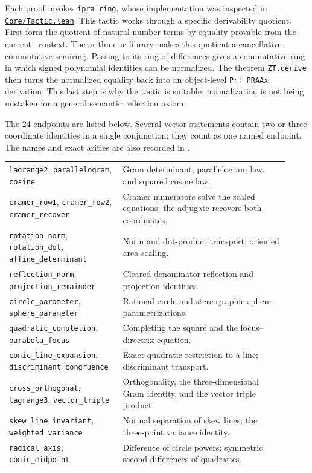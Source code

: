 Each proof invokes \texttt{ipra\_ring}, whose implementation was inspected in
\href{https://github.com/VladimirReshetnikov/ProveIt/blob/bbb85238dac533fc4b7b84a750cca864fe35fed5/Logic/PrimitiveRecursiveArithmetic/Derivations/Lean/IPRADerivations/Core/Tactic.lean}{\texttt{Core/Tactic.lean}}.
This tactic works through a specific derivability quotient.  First form the
quotient of natural-number terms by equality provable from the current
\ipra\ context.  The arithmetic library makes this quotient a cancellative
commutative semiring.  Passing to its ring of differences gives a commutative
ring in which signed polynomial identities can be normalized.  The theorem
\texttt{ZT.derive} then turns the normalized equality back into an object-level
\texttt{Prf PRAAx} derivation.  This last step is why the tactic is suitable:
normalization is not being mistaken for a general semantic reflection axiom.

The 24 endpoints are listed below.  Several vector statements contain two or
three coordinate identities in a single conjunction; they count as one named
endpoint.  The names and exact arities are also recorded in
.

\begin{center}
\begin{tabular}{p{0.36\linewidth}p{0.56\linewidth}}
\texttt{lagrange2}, \texttt{parallelogram}, \texttt{cosine}
 & Gram determinant, parallelogram law, and squared cosine law.\\[4pt]
\texttt{cramer\_row1}, \texttt{cramer\_row2}, \texttt{cramer\_recover}
 & Cramer numerators solve the scaled equations; the adjugate recovers both
 coordinates.\\[4pt]
\texttt{rotation\_norm}, \texttt{rotation\_dot}, \texttt{affine\_determinant}
 & Norm and dot-product transport; oriented area scaling.\\[4pt]
\texttt{reflection\_norm}, \texttt{projection\_remainder}
 & Cleared-denominator reflection and projection identities.\\[4pt]
\texttt{circle\_parameter}, \texttt{sphere\_parameter}
 & Rational circle and stereographic sphere parametrizations.\\[4pt]
\texttt{quadratic\_completion}, \texttt{parabola\_focus}
 & Completing the square and the focus--directrix equation.\\[4pt]
\texttt{conic\_line\_expansion}, \texttt{discriminant\_congruence}
 & Exact quadratic restriction to a line; discriminant transport.\\[4pt]
\texttt{cross\_orthogonal}, \texttt{lagrange3}, \texttt{vector\_triple}
 & Orthogonality, the three-dimensional Gram identity, and the vector triple
 product.\\[4pt]
\texttt{skew\_line\_invariant}, \texttt{weighted\_variance}
 & Normal separation of skew lines; the three-point variance identity.\\[4pt]
\texttt{radical\_axis}, \texttt{conic\_midpoint}
 & Difference of circle powers; symmetric second differences of quadratics.\\
\end{tabular}
\end{center}

